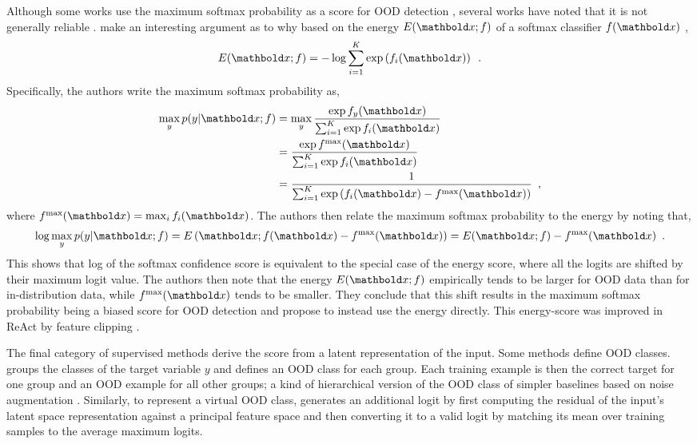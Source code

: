 Although some works use the maximum softmax probability as a score for OOD detection \parencite{hendrycks_deep_2019,ren_likelihood_2019}, several works have noted that it is not generally reliable \parencite{hendrycks_scaling_2022,liu_energy-based_2020}. 
\textcite{liu_energy-based_2020} make an interesting argument as to why based on the energy $E(\xb; f)$ of a softmax classifier $f(\xb)$ \parencite{lecun_tutorial_2006},
%
\begin{equation} \label{eq:softmax-classifier-energy}
    E(\xb; f) = - \log \sum_{i=1}^K \exp \left( f_i(\xb) \right) \enspace .
\end{equation}
%
Specifically, the authors write the maximum softmax probability as,
%
\begin{align} \label{eq:softmax-classifier-maximum-probability}
    \max_y p(y|\xb;f) 
    &= \max_y \frac{\exp f_y(\xb)}{\sum_{i=1}^K \exp f_i(\xb)} \nonumber \\
    &= \frac{\exp f^\text{max}(\xb)}{\sum_{i=1}^K \exp f_i(\xb)} \nonumber \\
    &= \frac{1}{\sum_{i=1}^K \exp \left(f_i(\xb) - f^\text{max}(\xb)\right)} \enspace ,
\end{align}
where $f^\text{max}(\xb) = \max_i f_i(\xb)$. 
The authors then relate the maximum softmax probability to the energy by noting that,
%
\begin{align}
    \log \max_y p(y|\xb;f) = E\left(\xb; f(\xb) - f^\text{max}(\xb)\right) = E(\xb; f) - f^\text{max}(\xb) \enspace .
\end{align}
%
This shows that log of the softmax confidence score is equivalent to the special case of the energy score, where all the logits are shifted by their maximum logit value. 
The authors then note that the energy $E(\xb; f)$ empirically tends to be larger for OOD data than for in-distribution data, while $f^\text{max}(\xb)$ tends to be smaller. 
They conclude that this shift results in the maximum softmax probability being a biased score for OOD detection and propose to instead use the energy directly. This energy-score was improved in ReAct by feature clipping \parencite{sun_react_2021}. 

The final category of supervised methods derive the score from a latent representation of the input. 
Some methods define OOD classes. \textcite{huang_mos_2021} groups the classes of the target variable $y$ and defines an OOD class for each group. Each training example is then the correct target for one group and an OOD example for all other groups; a kind of hierarchical version of the OOD class of simpler baselines based on noise augmentation \parencite{ren_likelihood_2019}. 
Similarly, to represent a virtual OOD class, \textcite{wang_vim_2022} generates an additional logit by first computing the residual of the input's latent space representation against a principal feature space and then converting it to a valid logit by matching its mean over training samples to the average maximum logits. 

